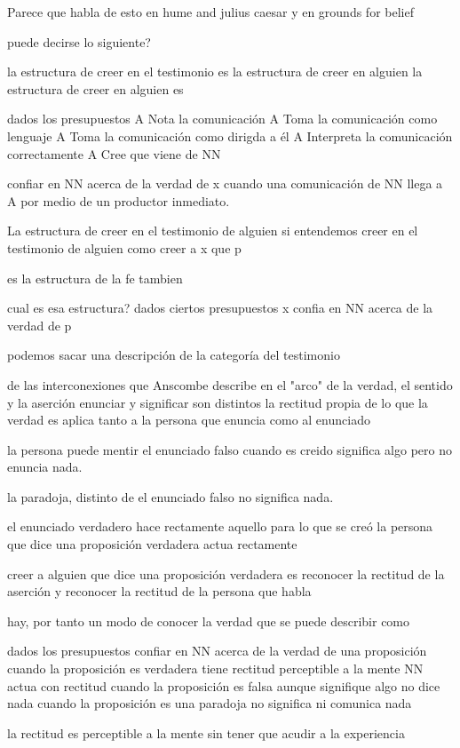 Parece que habla de esto en hume and julius caesar y en grounds for belief

puede decirse lo siguiente?

la estructura de creer en el testimonio es la estructura de creer en alguien
la estructura de creer en alguien es

dados los presupuestos
A Nota la comunicación
A Toma la comunicación como lenguaje
A Toma la comunicación como dirigda a él
A Interpreta la comunicación correctamente
A Cree que viene de NN

confiar en NN acerca de la verdad de x cuando una comunicación de NN llega a A por medio de un productor inmediato.

La estructura de creer en el testimonio de alguien
si entendemos creer en el testimonio de alguien como
creer a x que p

es la estructura de la fe tambien

cual es esa estructura?
dados ciertos presupuestos
x confia en NN acerca de la verdad de p

podemos sacar una descripción de
la categoría del testimonio

de las interconexiones que Anscombe describe
en el "arco" de la verdad, el sentido y la aserción
enunciar y significar son distintos
la rectitud propia de lo que la verdad es aplica tanto a la persona que enuncia como al enunciado

la persona puede mentir
el enunciado falso cuando es creido significa algo pero no enuncia nada.

la paradoja, distinto de el enunciado falso no significa nada.

el enunciado verdadero hace rectamente aquello para lo que se creó
la persona que dice una proposición verdadera actua rectamente

creer a alguien que dice una proposición verdadera es reconocer la rectitud de la aserción y reconocer la rectitud de la persona que habla

hay, por tanto un modo de conocer la verdad que se puede describir como

dados los presupuestos
confiar en NN acerca de la verdad de una proposición
cuando la proposición es verdadera tiene rectitud perceptible a la mente
NN actua con rectitud
cuando la proposición es falsa aunque signifique algo no dice nada
cuando la proposición es una paradoja no significa ni comunica nada

la rectitud es perceptible a la mente sin tener que acudir a la experiencia


